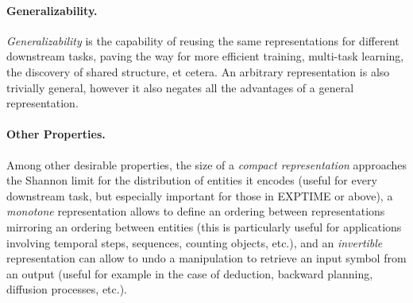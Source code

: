 \paragraph{Generalizability.} \textit{Generalizability} is the capability of reusing the same representations for different downstream tasks, paving the way for more efficient training, multi-task learning, the discovery of shared structure, et cetera.
An arbitrary representation is also trivially general, however it also negates all the advantages of a general representation.

\paragraph{Other Properties.} Among other desirable properties, the size of a \textit{compact representation} approaches the Shannon limit for the distribution of entities it encodes (useful for every downstream task, but especially important for those in \textsc{EXPTIME} or above), a \textit{monotone} representation allows to define an ordering between representations mirroring an ordering between entities (this is particularly useful for applications involving temporal steps, sequences, counting objects, etc.), and an \textit{invertible} representation can allow to undo a manipulation to retrieve an input symbol from an output (useful for example in the case of deduction, backward planning, diffusion processes, etc.).

